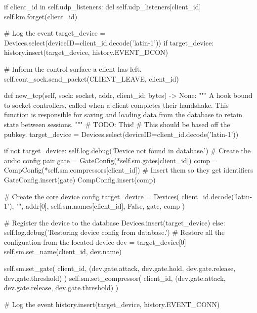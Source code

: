 \begin{pythoncode}
            if client_id in self.udp_listeners:
                del self.udp_listeners[client_id]
            self.km.forget(client_id)

            # Log the event
            target_device = Devices.select(deviceID=client_id.decode('latin-1'))
            if target_device:
                history.insert(target_device, history.EVENT_DCON)

            # Inform the control surface a client has left.
            self.cont_sock.send_packet(CLIENT_LEAVE, client_id)

    def new_tcp(self, sock: socket, addr, client_id: bytes) -> None:
        """
        A hook bound to socket controllers, called when a client completes
        their handshake. This function is responsible for saving and loading
        data from the database to retain state between sessions.
        """
        # TODO: This!
        #       This should be based off the pubkey.
        target_device = Devices.select(deviceID=client_id.decode('latin-1'))

        if not target_device:
            self.log.debug('Device not found in database.')
            # Create the audio config pair
            gate = GateConfig(*self.sm.gates[client_id])
            comp = CompConfig(*self.sm.compressors[client_id])
            # Insert them so they get identifiers
            GateConfig.insert(gate)
            CompConfig.insert(comp)

            # Create the core device config
            target_device = Devices(
                client_id.decode('latin-1'), "", addr[0],
                self.sm.names[client_id],
                False, gate, comp
            )

            # Register the device to the database
            Devices.insert(target_device)
        else:
            self.log.debug('Restoring device config from database.')
            # Restore all the configuation from the located device
            dev = target_device[0]
            self.sm.set_name(client_id, dev.name)

            self.sm.set_gate(
                client_id, (dev.gate.attack, dev.gate.hold,
                            dev.gate.release, dev.gate.threshold)
            )
            self.sm.set_compressor(
                client_id, (dev.gate.attack, dev.gate.release,
                            dev.gate.threshold)
            )
        
        # Log the event
        history.insert(target_device, history.EVENT_CONN)
        

\end{pythoncode}
